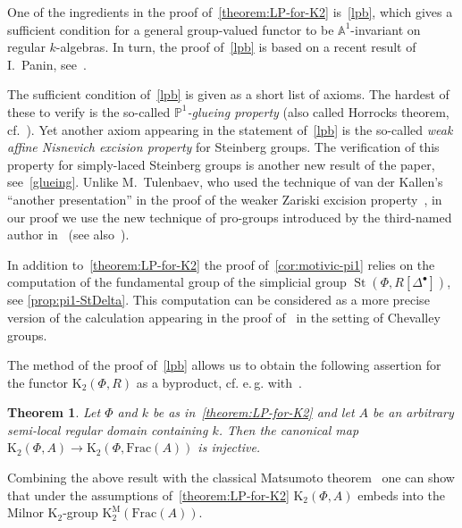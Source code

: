 \documentclass[oneside, 11pt]{amsart} \pdfoutput=1
\newcommand{\K}{{\mathrm{K}}}
\newcommand{\St}{\mathop{\mathrm{St}}\nolimits}
\numberwithin{equation}{section}
\newtheorem{theorem}[lemma]{Theorem}
\theoremstyle{definition}
\begin{document}
One of the ingredients in the proof of~\cref{theorem:LP-for-K2} is~\cref{lpb}, which gives a sufficient condition for a general group-valued functor to be $\mathbb{A}^1$-invariant on regular $k$-algebras. In turn, the proof of~\cref{lpb} is based on a recent result of I.~Panin, see~\cite[Theorem~2.5]{Pa19}. 

The sufficient condition of~\cref{lpb} is given as a short list of axioms. The hardest of these to verify is the so-called {\it $\mathbb{P}^1$-glueing property} (also called Horrocks theorem, cf.~\cite{LS20}). Yet another axiom appearing in the statement of~\cref{lpb} is the so-called {\it weak affine Nisnevich excision property} for Steinberg groups. The verification of this property for simply-laced Steinberg groups is another new result of the paper, see~\cref{glueing}. Unlike M.~Tulenbaev, who used the technique of van der Kallen's ``another presentation'' in the proof of the weaker Zariski excision property~\cite[Proposition~1.4]{Tu83}, in our proof we use the new technique of pro-groups introduced by the third-named author in~\cite{Vor1} (see also~\cite{LSV20}). %

In addition to~\cref{theorem:LP-for-K2} the proof of~\cref{cor:motivic-pi1} relies on the computation of the fundamental group of the simplicial group $\St(\Phi, R[\Delta^\bullet])$, see \cref{prop:pi1-StDelta}. This computation can be considered as a more precise version of the calculation appearing in the proof of~\cite[Proposition~3.2]{VW16} in the setting of Chevalley groups.

The method of the proof of~\cref{lpb} allows us to obtain the following assertion for the functor $\K_2(\Phi, R)$ as a byproduct, cf. e.\,g. with~\cite[Theorem~1.2]{Sta20}.
\begin{theorem} \label{theorem:Gersten} Let $\Phi$ and $k$ be as in~\cref{theorem:LP-for-K2} and let $A$ be an arbitrary semi-local regular domain containing $k$. Then the canonical map $\K_2(\Phi, A) \to \K_2(\Phi, \mathrm{Frac}(A))$ is injective. \end{theorem}

Combining the above result with the classical Matsumoto theorem~\cite[Theorem~5.10]{Ma69} one can show that under the assumptions of~\cref{theorem:LP-for-K2} $\K_2(\Phi, A)$ embeds into the Milnor $\K_2$-group $\K_2^\mathrm{M}(\mathrm{Frac}(A))$.
\end{document}
